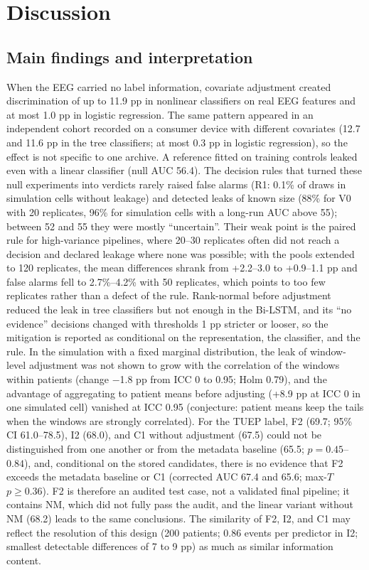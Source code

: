 \section{Discussion}\label{sec:discussion}

\subsection*{Main findings and interpretation}

When the EEG carried no label information, covariate adjustment created discrimination of up to 11.9 pp in nonlinear classifiers on real EEG features and at most 1.0 pp in logistic regression. The same pattern appeared in an independent cohort recorded on a consumer device with different covariates (12.7 and 11.6 pp in the tree classifiers; at most 0.3 pp in logistic regression), so the effect is not specific to one archive. A reference fitted on training controls leaked even with a linear classifier (null AUC 56.4).
The decision rules that turned these null experiments into verdicts rarely raised false alarms (R1: 0.1\% of draws in simulation cells without leakage) and detected leaks of known size (88\% for V0 with 20 replicates, 96\% for simulation cells with a long-run AUC above 55); between 52 and 55 they were mostly ``uncertain''. Their weak point is the paired rule for high-variance pipelines, where 20--30 replicates often did not reach a decision and declared leakage where none was possible; with the pools extended to 120 replicates, the mean differences shrank from +2.2--3.0 to +0.9--1.1 pp and false alarms fell to 2.7\%--4.2\% with 50 replicates, which points to too few replicates rather than a defect of the rule.
Rank-normal before adjustment reduced the leak in tree classifiers but not enough in the Bi-LSTM, and its ``no evidence'' decisions changed with thresholds 1 pp stricter or looser, so the mitigation is reported as conditional on the representation, the classifier, and the rule. In the simulation with a fixed marginal distribution, the leak of window-level adjustment was not shown to grow with the correlation of the windows within patients (change $-$1.8 pp from ICC 0 to 0.95; Holm 0.79), and the advantage of aggregating to patient means before adjusting (+8.9 pp at ICC 0 in one simulated cell) vanished at ICC 0.95 (conjecture: patient means keep the tails when the windows are strongly correlated).
For the TUEP label, F2 (69.7; 95\% CI 61.0--78.5), I2 (68.0), and C1 without adjustment (67.5) could not be distinguished from one another or from the metadata baseline (65.5; $p = 0.45$--$0.84$), and, conditional on the stored candidates, there is no evidence that F2 exceeds the metadata baseline or C1 (corrected AUC 67.4 and 65.6; max-$T$ $p \geq 0.36$). F2 is therefore an audited test case, not a validated final pipeline; it contains NM, which did not fully pass the audit, and the linear variant without NM (68.2) leads to the same conclusions. The similarity of F2, I2, and C1 may reflect the resolution of this design (200 patients; 0.86 events per predictor in I2; smallest detectable differences of 7 to 9 pp) as much as similar information content.
